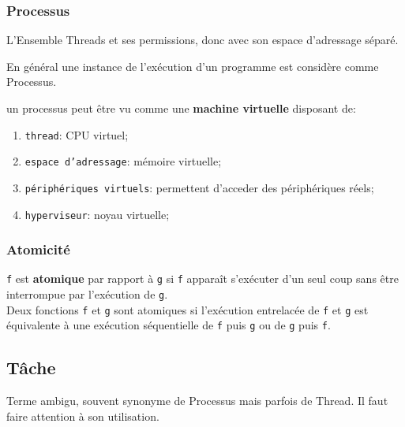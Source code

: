 \documentclass{article}
\begin{document}
\subsubsection{Processus}
\begin{definition}\label{def:processus}
    L'Ensemble Threads et ses permissions, donc avec son espace d'adressage séparé.

    \begin{remark}
        En général une instance de l'exécution d'un programme est considère comme Processus.
    \end{remark}

    \begin{phrase}
        un processus peut être vu comme une \textbf{machine virtuelle} disposant de:
        \begin{enumerate}[noitemsep]
            \item \texttt{thread}: CPU virtuel;
            \item \texttt{espace d'adressage}: mémoire virtuelle;
            \item \texttt{périphériques virtuels}: permettent d'acceder des périphériques réels;
            \item \texttt{hyperviseur}: noyau virtuelle;
        \end{enumerate}
    \end{phrase}
\end{definition}

\subsubsection{Atomicité}
\begin{definition}\label{def:atomicite}
    \texttt{f} est \textbf{atomique} par rapport à \texttt{g} si \texttt{f} apparaît s'exécuter d'un seul coup sans être interrompue par l'exécution de \texttt{g}.\\

    Deux fonctions \texttt{f} et \texttt{g} sont atomiques si l'exécution entrelacée de \texttt{f} et \texttt{g} est équivalente à une exécution séquentielle de \texttt{f} puis \texttt{g} ou de \texttt{g} puis \texttt{f}.
\end{definition}

\subsection{Tâche}
\begin{definition}\label{def:tache}
    Terme ambigu, souvent synonyme de Processus mais parfois de Thread. Il faut faire attention à son utilisation.
\end{definition}
\end{document}
